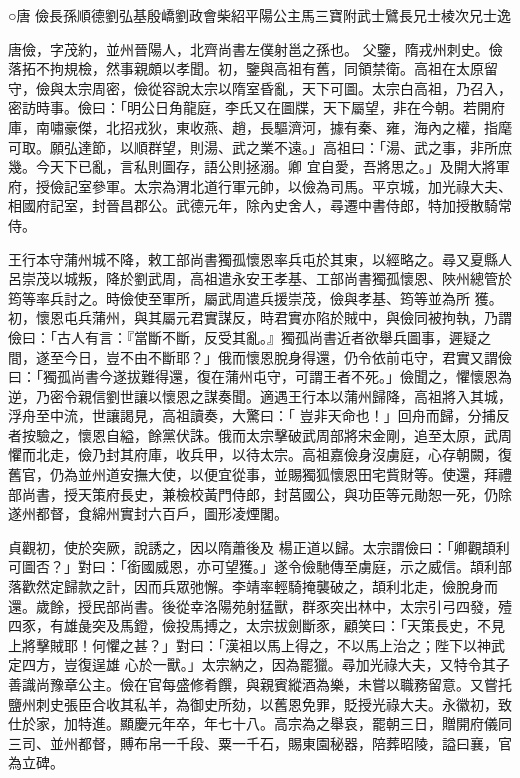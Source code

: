 
\begin{pinyinscope}

 ○唐
 儉長孫順德劉弘基殷嶠劉政會柴紹平陽公主馬三寶附武士鷿長兄士棱次兄士逸



 唐儉，字茂約，並州晉陽人，北齊尚書左僕射邕之孫也。
 父鑒，隋戎州刺史。儉落拓不拘規檢，然事親頗以孝聞。初，鑒與高祖有舊，同領禁衛。高祖在太原留守，儉與太宗周密，儉從容說太宗以隋室昏亂，天下可圖。太宗白高祖，乃召入，密訪時事。儉曰：「明公日角龍庭，李氏又在圖牒，天下屬望，非在今朝。若開府庫，南嘯豪傑，北招戎狄，東收燕、趙，長驅濟河，據有秦、雍，海內之權，指麾可取。願弘達節，以順群望，則湯、武之業不遠。」高祖曰：「湯、武之事，非所庶幾。今天下已亂，言私則圖存，語公則拯溺。卿
 宜自愛，吾將思之。」及開大將軍府，授儉記室參軍。太宗為渭北道行軍元帥，以儉為司馬。平京城，加光祿大夫、相國府記室，封晉昌郡公。武德元年，除內史舍人，尋遷中書侍郎，特加授散騎常侍。



 王行本守蒲州城不降，敕工部尚書獨孤懷恩率兵屯於其東，以經略之。尋又夏縣人呂崇茂以城叛，降於劉武周，高祖遣永安王孝基、工部尚書獨孤懷恩、陜州總管於筠等率兵討之。時儉使至軍所，屬武周遣兵援崇茂，儉與孝基、筠等並為所
 獲。初，懷恩屯兵蒲州，與其屬元君實謀反，時君實亦陷於賊中，與儉同被拘執，乃謂儉曰：「古人有言：『當斷不斷，反受其亂。』獨孤尚書近者欲舉兵圖事，遲疑之間，遂至今日，豈不由不斷耶？」俄而懷恩脫身得還，仍令依前屯守，君實又謂儉曰：「獨孤尚書今遂拔難得還，復在蒲州屯守，可謂王者不死。」儉聞之，懼懷恩為逆，乃密令親信劉世讓以懷恩之謀奏聞。適遇王行本以蒲州歸降，高祖將入其城，浮舟至中流，世讓謁見，高祖讀奏，大驚曰：「
 豈非天命也！」回舟而歸，分捕反者按驗之，懷恩自縊，餘黨伏誅。俄而太宗擊破武周部將宋金剛，追至太原，武周懼而北走，儉乃封其府庫，收兵甲，以待太宗。高祖嘉儉身沒虜庭，心存朝闕，復舊官，仍為並州道安撫大使，以便宜從事，並賜獨狐懷恩田宅貲財等。使還，拜禮部尚書，授天策府長史，兼檢校黃門侍郎，封莒國公，與功臣等元勛恕一死，仍除遂州都督，食綿州實封六百戶，圖形凌煙閣。



 貞觀初，使於突厥，說誘之，因以隋蕭後及
 楊正道以歸。太宗謂儉曰：「卿觀頡利可圖否？」對曰：「銜國威恩，亦可望獲。」遂令儉馳傳至虜庭，示之威信。頡利部落歡然定歸款之計，因而兵眾弛懈。李靖率輕騎掩襲破之，頡利北走，儉脫身而還。歲餘，授民部尚書。後從幸洛陽苑射猛獸，群豕突出林中，太宗引弓四發，殪四豕，有雄彘突及馬鐙，儉投馬搏之，太宗拔劍斷豕，顧笑曰：「天策長史，不見上將擊賊耶！何懼之甚？」對曰：「漢祖以馬上得之，不以馬上治之；陛下以神武定四方，豈復逞雄
 心於一獸。」太宗納之，因為罷獵。尋加光祿大夫，又特令其子善識尚豫章公主。儉在官每盛修肴饌，與親賓縱酒為樂，未嘗以職務留意。又嘗托鹽州刺史張臣合收其私羊，為御史所劾，以舊恩免罪，貶授光祿大夫。永徽初，致仕於家，加特進。顯慶元年卒，年七十八。高宗為之舉哀，罷朝三日，贈開府儀同三司、並州都督，賻布帛一千段、粟一千石，賜東園秘器，陪葬昭陵，謚曰襄，官為立碑。




\end{pinyinscope}
